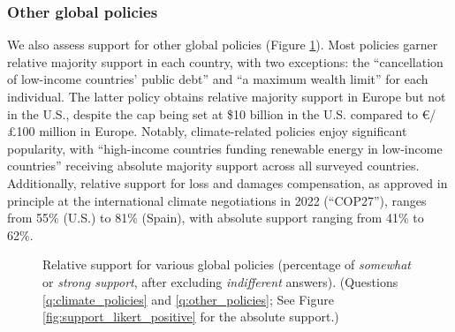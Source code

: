 \subsubsection{Other global policies}\label{subsubsec:support_other_global_policies} %

We also assess support for other global policies (Figure \ref{fig:support}). Most policies garner relative majority support in each country, with two exceptions: the ``cancellation of low-income countries' public debt'' and ``a maximum wealth limit'' for each individual. The latter policy obtains relative majority support in Europe but not in the U.S., despite the cap being set at \$10 billion in the U.S. compared to \euro{}/£100 million in Europe. Notably, climate-related policies enjoy significant popularity, with ``high-income countries funding renewable energy in low-income countries'' receiving absolute majority support across all surveyed countries. Additionally, relative support for loss and damages compensation, as approved in principle at the international climate negotiations in 2022 (``COP27''), ranges from 55\% (U.S.) to 81\% (Spain), with absolute support ranging from 41\% to 62\%.

\setcounter{figure}{1}
\renewcommand{\thefigure}{\arabic{figure}}
\begin{figure}
  \caption[Relative support for further global policies]{Relative support for various global policies (percentage of \textit{somewhat} or \textit{strong support}, after excluding \textit{indifferent} answers). (Questions \ref{q:climate_policies} and \ref{q:other_policies}; See Figure \ref{fig:support_likert_positive} for the absolute support.)%
  }
  \label{fig:support}
\end{figure} 
\renewcommand{\thefigure}{S\arabic{figure}}

